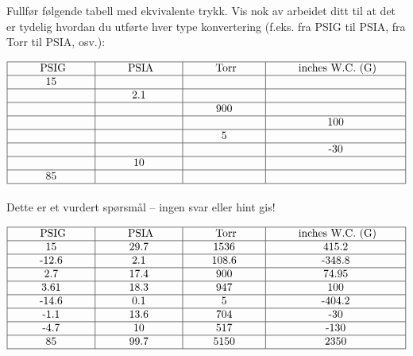 

Fullfør følgende tabell med ekvivalente trykk.  Vis nok av arbeidet ditt til at det er tydelig hvordan du utførte hver type konvertering (f.eks. fra PSIG til PSIA, fra Torr til PSIA, osv.):


$$\vbox{\offinterlineskip
\halign{\strut
\vrule \quad\hfil # \ \hfil & 
\vrule \quad\hfil # \ \hfil & 
\vrule \quad\hfil # \ \hfil & 
\vrule \quad\hfil # \ \hfil \vrule \cr
\noalign{\hrule}
%
\hskip 20pt PSIG \hskip 20pt & \hskip 20pt PSIA \hskip 20pt & \hskip 20pt Torr \hskip 20pt & \hskip 20pt inches W.C. (G) \hskip 20pt \cr
%
\noalign{\hrule}
%
15 &  &  &  \cr
%
\noalign{\hrule}
%
  & 2.1 &  &  \cr
%
\noalign{\hrule}
%
  &  & 900 &  \cr
%
\noalign{\hrule}
%
  &  &  & 100 \cr
%
\noalign{\hrule}
%
  &  & 5 &  \cr
%
\noalign{\hrule}
%
  &  &  & -30 \cr
%
\noalign{\hrule}
%
  & 10 &  &  \cr
%
\noalign{\hrule}
%
85  &  &  &  \cr
%
\noalign{\hrule}
} %
}$$ %

\vfil 

\eject






Dette er et vurdert spørsmål -- ingen svar eller hint gis!








$$\vbox{\offinterlineskip
\halign{\strut
\vrule \quad\hfil # \ \hfil & 
\vrule \quad\hfil # \ \hfil & 
\vrule \quad\hfil # \ \hfil & 
\vrule \quad\hfil # \ \hfil \vrule \cr
\noalign{\hrule}
%
\hskip 20pt PSIG \hskip 20pt & \hskip 20pt PSIA \hskip 20pt & \hskip 20pt Torr \hskip 20pt & \hskip 20pt inches W.C. (G) \hskip 20pt \cr
%
\noalign{\hrule}
%
15 & 29.7 & 1536 & 415.2 \cr
%
\noalign{\hrule}
%
-12.6 & 2.1 & 108.6 & -348.8 \cr
%
\noalign{\hrule}
%
2.7 & 17.4 & 900 & 74.95 \cr
%
\noalign{\hrule}
%
3.61 & 18.3 & 947 & 100 \cr
%
\noalign{\hrule}
%
-14.6 & 0.1 & 5 & -404.2 \cr
%
\noalign{\hrule}
%
-1.1 & 13.6 & 704 & -30 \cr
%
\noalign{\hrule}
%
-4.7 & 10 & 517 & -130 \cr
%
\noalign{\hrule}
%
85 & 99.7 & 5150 & 2350 \cr
%
\noalign{\hrule}
} %
}$$ %


